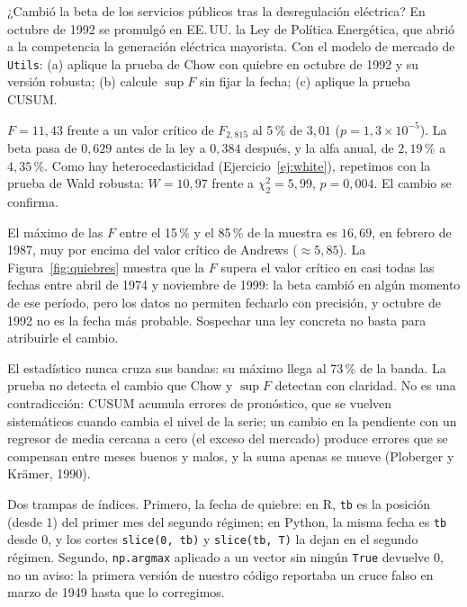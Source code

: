 \begin{ejresuelto}{¿Cambió la beta de los servicios públicos tras la desregulación eléctrica?}\label{ej:chow}
\enunciado En octubre de 1992 se promulgó en EE.\,UU. la Ley de Política Energética, que abrió a la
competencia la generación eléctrica mayorista. Con el modelo de mercado de \texttt{Utils}: (a) aplique la
prueba de Chow con quiebre en octubre de 1992 y su versión robusta; (b) calcule $\sup F$ sin fijar la fecha;
(c) aplique la prueba CUSUM.

\solucion
{} $F=11{,}43$ frente a un valor crítico de $F_{2,815}$ al 5\,\% de $3{,}01$ ($p=1{,}3\times10^{-5}$).
La beta pasa de $0{,}629$ antes de la ley a $0{,}384$ después, y la alfa anual, de $2{,}19$\,\% a $4{,}35$\,\%.
Como hay heterocedasticidad (Ejercicio~\ref{ej:white}), repetimos con la prueba de Wald robusta: $W=10{,}97$
frente a $\chi^2_2=5{,}99$, $p=0{,}004$. El cambio se confirma.

 El máximo de las $F$ entre el 15\,\% y el 85\,\% de la muestra es
$16{,}69$, en febrero de 1987, muy por encima del valor crítico de Andrews ($\approx5{,}85$). La
Figura~\ref{fig:quiebres} muestra que la $F$ supera el valor crítico en casi todas las fechas entre abril de
1974 y noviembre de 1999: la beta cambió en algún momento de ese período, pero los datos no permiten
fecharlo con precisión, y octubre de 1992 no es la fecha más probable. Sospechar una ley concreta no basta
para atribuirle el cambio.

 El estadístico nunca cruza sus bandas: su máximo llega al 73\,\% de la banda. La prueba
no detecta el cambio que Chow y $\sup F$ detectan con claridad. No es una contradicción: CUSUM acumula errores
de pronóstico, que se vuelven sistemáticos cuando cambia el nivel de la serie; un cambio en la pendiente con
un regresor de media cercana a cero (el exceso del mercado) produce errores que se compensan entre meses
buenos y malos, y la suma apenas se mueve (Ploberger y Krämer, 1990).


\RvsPy Dos trampas de índices. Primero, la fecha de quiebre: en R, \texttt{tb} es la posición (desde 1) del
primer mes del segundo régimen; en Python, la misma fecha es \texttt{tb} desde 0, y los cortes
\texttt{slice(0, tb)} y \texttt{slice(tb, T)} la dejan en el segundo régimen. Segundo, \texttt{np.argmax}
aplicado a un vector sin ningún \texttt{True} devuelve 0, no un aviso: la primera versión de nuestro código
reportaba un cruce falso en marzo de 1949 hasta que lo corregimos.


\end{ejresuelto}
